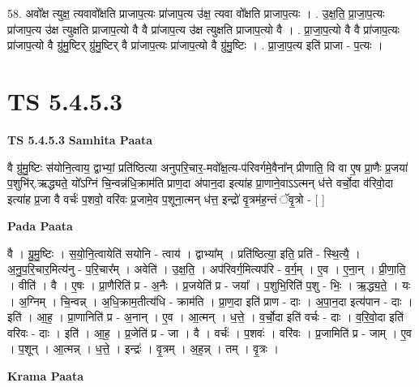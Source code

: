 \documentclass[17pt]{extarticle}
\begin{document}
58. अवो᳚क्ष त्युक्ष॒ त्यवावो᳚क्षति प्राजाप॒त्यः प्रा॑जाप॒त्य उ॑क्ष॒ त्यवा वो᳚क्षति प्राजाप॒त्यः । . उ॒क्ष॒ति॒ प्रा॒जा॒प॒त्यः प्रा॑जाप॒त्य उ॑क्ष त्युक्षति प्राजाप॒त्यो वै वै प्रा॑जाप॒त्य उ॑क्ष त्युक्षति प्राजाप॒त्यो वै । . प्रा॒जा॒प॒त्यो वै वै प्रा॑जाप॒त्यः प्रा॑जाप॒त्यो वै ग्रु॑मु॒ष्टिर् ग्रु॑मु॒ष्टिर् वै प्रा॑जाप॒त्यः प्रा॑जाप॒त्यो वै ग्रु॑मु॒ष्टिः । . प्रा॒जा॒प॒त्य इति॑ प्राजा - प॒त्यः । \newline
\pagebreak
{}

\section{ TS 5.4.5.3 }

\textbf{TS 5.4.5.3 } \newline
\textbf{Samhita Paata} \newline

वै ग्रु॑मु॒ष्टिः स॑योनि॒त्वाय॒ द्वाभ्यां॒ प्रति॑ष्ठित्या अनुपरि॒चार॒-मवो᳚क्ष॒त्य-प॑रिवर्गमे॒वैना᳚न् प्रीणाति॒ वि वा ए॒ष प्रा॒णैः प्र॒जया॑ प॒शुभि॑र्.ऋद्ध्यते॒ यो᳚ऽग्निं चि॒न्वन्न॑धि॒क्राम॑ति प्राण॒दा अ॑पान॒दा इत्या॑ह प्रा॒णाने॒वाऽऽत्मन् ध॑त्ते वर्चो॒दा व॑रिवो॒दा इत्या॑ह प्र॒जा वै वर्चः॑ प॒शवो॒ वरि॑वः प्र॒जामे॒व प॒शूना॒त्मन् ध॑त्त॒ इन्द्रो॑ वृ॒त्रम॑ह॒न्तं ॅवृ॒त्रो - [  ] \newline

\textbf{Pada Paata} \newline

वै । ग्रु॒मु॒ष्टिः । स॒यो॒नि॒त्वायेति॑ सयोनि - त्वाय॑ । द्वाभ्या᳚म् । प्रति॑ष्ठित्या॒ इति॒ प्रति॑ - स्थि॒त्यै॒ । अ॒नु॒प॒रि॒चार॒मित्य॑नु - प॒रि॒चार᳚म् । अवेति॑ । उ॒क्ष॒ति॒ । अप॑रिवर्ग॒मित्यप॑रि - व॒र्ग॒म् । ए॒व । ए॒ना॒न् । प्री॒णा॒ति॒ । वीति॑ । वै । ए॒षः । प्रा॒णैरिति॑ प्र - अ॒नैः । प्र॒जयेति॑ प्र - जया᳚ । प॒शुभि॒रिति॑ प॒शु - भिः॒ । ऋ॒द्ध्य॒ते॒ । यः । अ॒ग्निम् । चि॒न्वन्न् । अ॒धि॒क्राम॒तीत्य॑धि - क्राम॑ति । प्रा॒ण॒दा इति॑ प्राण - दाः । अ॒पा॒न॒दा इत्य॑पान - दाः । इति॑ । आ॒ह॒ । प्रा॒णानिति॑ प्र - अ॒नान् । ए॒व । आ॒त्मन् । ध॒त्ते॒ । व॒र्चो॒दा इति॑ वर्चः - दाः । व॒रि॒वो॒दा इति॑ वरिवः - दाः । इति॑ । आ॒ह॒ । प्र॒जेति॑ प्र - जा । वै । वर्चः॑ । प॒शवः॑ । वरि॑वः । प्र॒जामिति॑ प्र - जाम् । ए॒व । प॒शून् । आ॒त्मन्न् । ध॒त्ते॒ । इन्द्रः॑ । वृ॒त्रम् । अ॒ह॒न्न् । तम् । वृ॒त्रः ।  \newline


\textbf{Krama Paata} \newline
\end{document}
